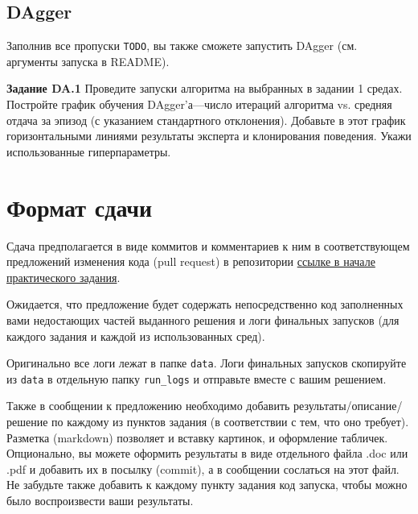\documentclass[12pt, oneside]{article}
\begin{document}
\subsection{DAgger}

Заполнив все пропуски \verb|TODO|, вы также сможете запустить DAgger (см. аргументы запуска в README).

\textbf{Задание DA.1} Проведите запуски алгоритма на выбранных в задании 1 средах. Постройте график обучения DAgger'а---число итераций алгоритма vs. средняя отдача за эпизод (с указанием стандартного отклонения). Добавьте в этот график горизонтальными линиями результаты эксперта и клонирования поведения. Укажи использованные гиперпараметры.

\section{Формат сдачи}

Сдача предполагается в виде коммитов и комментариев к ним в соответствующем предложений изменения кода (pull request) в репозитории \href{https://github.com/pkuderov/mipt-rl-hw-2023}{ссылке в начале практического задания}.

Ожидается, что предложение будет содержать непосредственно код заполненных вами недостающих частей выданного решения и логи финальных запусков (для каждого задания и каждой из использованных сред). 

Оригинально все логи лежат в папке \verb|data|. Логи финальных запусков скопируйте из \verb|data| в отдельную папку \verb|run_logs| и отправьте вместе с вашим решением.

Также в сообщении к предложению необходимо добавить результаты/описание/решение по каждому из пунктов задания (в соответствии с тем, что оно требует). Разметка (markdown) позволяет и вставку картинок, и оформление табличек. Опционально, вы можете оформить результаты в виде отдельного файла .doc или .pdf и добавить их в посылку (commit), а в сообщении сослаться на этот файл. Не забудьте также добавить к каждому пункту задания код запуска, чтобы можно было воспроизвести ваши результаты.
\end{document}
